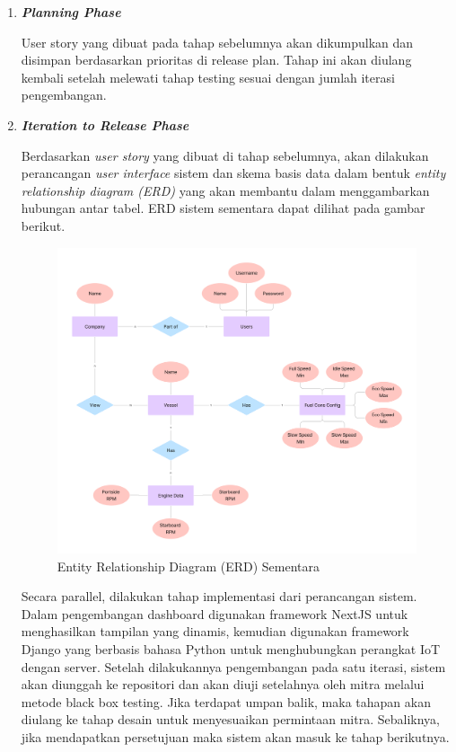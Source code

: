 \begin{enumerate}
\begin{enumerate}[label*=\arabic*.]
\begin{enumerate}[label*=\arabic*.]
            \item \textbf{\textit{Planning Phase}}
            
            User story yang dibuat pada tahap sebelumnya akan dikumpulkan dan disimpan berdasarkan prioritas di release plan. Tahap ini akan diulang kembali setelah melewati tahap testing sesuai dengan jumlah iterasi pengembangan.
            
            

            \item \textbf{\textit{Iteration to Release Phase}}
            
            Berdasarkan \textit{user story} yang dibuat di tahap sebelumnya, akan dilakukan perancangan \textit{user interface} sistem dan skema basis data dalam bentuk \textit{entity relationship diagram (ERD)} yang akan membantu dalam menggambarkan hubungan antar tabel. ERD sistem sementara dapat dilihat pada gambar berikut.

            \begin{figure}[!h]
                \includegraphics[width=1\linewidth, center]{images/metode/erd.png}
                \caption{Entity Relationship Diagram (ERD) Sementara}
                \label{fig:erd}
            \end{figure}

            Secara parallel, dilakukan tahap implementasi dari perancangan sistem. Dalam pengembangan dashboard digunakan framework NextJS untuk menghasilkan tampilan yang dinamis, kemudian digunakan framework Django yang berbasis bahasa Python untuk menghubungkan perangkat IoT dengan server. Setelah dilakukannya pengembangan pada satu iterasi, sistem akan diunggah ke repositori dan akan diuji setelahnya oleh mitra melalui metode black box testing. Jika terdapat umpan balik, maka tahapan akan diulang ke tahap desain untuk menyesuaikan permintaan mitra. Sebaliknya, jika mendapatkan persetujuan maka sistem akan masuk ke tahap berikutnya.


\end{enumerate}
\end{enumerate}
\end{enumerate}

